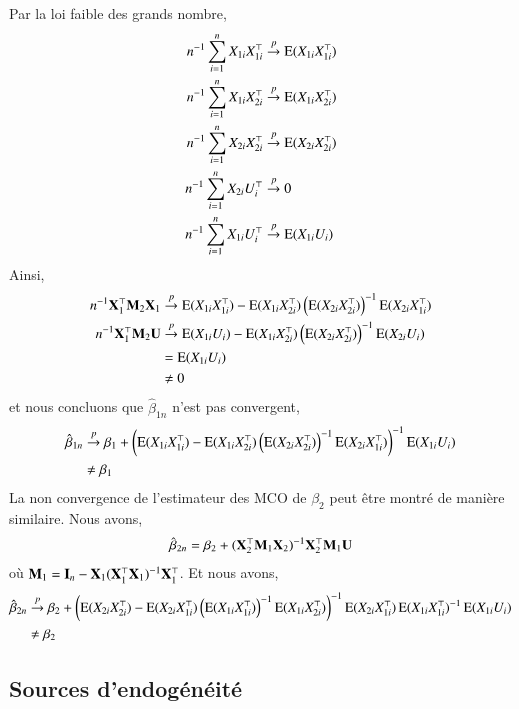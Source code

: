 	Par la loi faible des grands nombre,
	\begin{align*}
	n^{-1}\sum_{i=1}^n X_{1i}X_{1i}^\top &\overset{p}{\rightarrow} \operatorname{E}(X_{1i}X_{1i}^\top)\\
	n^{-1}\sum_{i=1}^n X_{1i}X_{2i}^\top &\overset{p}{\rightarrow} \operatorname{E}(X_{1i}X_{2i}^\top)\\
	n^{-1}\sum_{i=1}^n X_{2i}X_{2i}^\top &\overset{p}{\rightarrow} \operatorname{E}(X_{2i}X_{2i}^\top)\\
	n^{-1}\sum_{i=1}^n X_{2i}U_i^\top &\overset{p}{\rightarrow} 0\\
	n^{-1}\sum_{i=1}^n X_{1i}U_i^\top &\overset{p}{\rightarrow} \operatorname{E}(X_{1i}U_i)
	\end{align*}
	Ainsi,
	\begin{align*}
	n^{-1}\mathbf X_1^\top\mathbf M_2\mathbf X_1 &\overset{p}{\rightarrow} \operatorname{E}(X_{1i}X_{1i}^\top)-\operatorname{E}(X_{1i}X_{2i}^\top)\left( \operatorname{E}(X_{2i}X_{2i}^\top)\right)^{-1}\operatorname{E}(X_{2i}X_{1i}^\top)\\
	n^{-1}\mathbf X_1^\top\mathbf M_2\mathbf U &\overset{p}{\rightarrow} \operatorname{E}(X_{1i}U_i) - \operatorname{E}(X_{1i}X_{2i}^\top)\left( \operatorname{E}(X_{2i}X_{2i}^\top)\right)^{-1}\operatorname{E}(X_{2i}U_i)\\
	&=\operatorname{E}(X_{1i}U_i) \\
	&\neq 0
	\end{align*}
	et nous concluons que $\hat{\beta}_{1n} $ n'est pas convergent,
	\begin{align*}
	\hat{\beta}_{1n} &\overset{p}{\rightarrow} \beta_1 + \left(\operatorname{E}(X_{1i}X_{1i}^\top)-\operatorname{E}(X_{1i}X_{2i}^\top)\left( \operatorname{E}(X_{2i}X_{2i}^\top)\right)^{-1}\operatorname{E}(X_{2i}X_{1i}^\top)\right)^{-1}\operatorname{E}(X_{1i}U_i)\\
	&\neq \beta_1
	\end{align*}
	La non convergence de l'estimateur des MCO de $\beta_2$ peut être montré de manière similaire. Nous avons,
	\begin{align*}
	\hat{\beta}_{2n} = \beta_2 + (\mathbf X_2^\top\mathbf M_1\mathbf X_2)^{-1}\mathbf X_2^\top\mathbf M_1\mathbf U
	\end{align*}
	où $\mathbf M_1 = \mathbf{I}_n - \mathbf X_1(\mathbf X_1^\top\mathbf X_1)^{-1}\mathbf X_1^\top$. Et nous avons,
	\begin{align*}
	\hat{\beta}_{2n}  &\overset{p}{\rightarrow} \beta_2 + \left(\operatorname{E}(X_{2i}X_{2i}^\top)-\operatorname{E}(X_{2i}X_{1i}^\top)\left( \operatorname{E}(X_{1i}X_{1i}^\top)\right)^{-1}\operatorname{E}(X_{1i}X_{2i}^\top)\right)^{-1}\operatorname{E}(X_{2i}X_{1i}^\top)\operatorname{E}(X_{1i}X_{1i}^\top)^{-1}\operatorname{E}(X_{1i}U_i)\\
	&\neq \beta_2
	\end{align*}

\subsection{Sources d'endogénéité}
